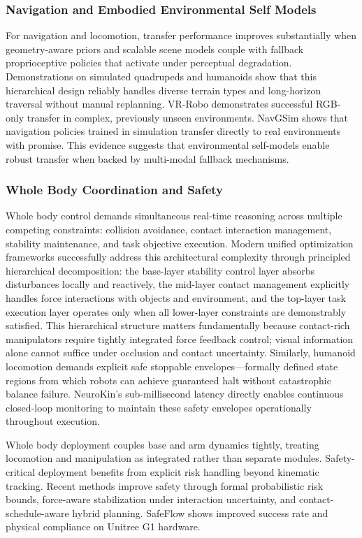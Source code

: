 ﻿\documentclass[11pt,a4paper]{article}
\begin{document}
\subsubsection{Navigation and Embodied Environmental Self Models}

For navigation and locomotion, transfer performance improves substantially when geometry-aware priors and scalable scene models couple with fallback proprioceptive policies that activate under perceptual degradation. Demonstrations on simulated quadrupeds and humanoids show that this hierarchical design reliably handles diverse terrain types and long-horizon traversal without manual replanning. VR-Robo demonstrates successful RGB-only transfer in complex, previously unseen environments. NavGSim shows that navigation policies trained in simulation transfer directly to real environments with promise. This evidence suggests that environmental self-models enable robust transfer when backed by multi-modal fallback mechanisms.

\subsubsection{Whole Body Coordination and Safety}

Whole body control demands simultaneous real-time reasoning across multiple competing constraints: collision avoidance, contact interaction management, stability maintenance, and task objective execution. Modern unified optimization frameworks successfully address this architectural complexity through principled hierarchical decomposition: the base-layer stability control layer absorbs disturbances locally and reactively, the mid-layer contact management explicitly handles force interactions with objects and environment, and the top-layer task execution layer operates only when all lower-layer constraints are demonstrably satisfied. This hierarchical structure matters fundamentally because contact-rich manipulators require tightly integrated force feedback control; visual information alone cannot suffice under occlusion and contact uncertainty. Similarly, humanoid locomotion demands explicit safe stoppable envelopes—formally defined state regions from which robots can achieve guaranteed halt without catastrophic balance failure. NeuroKin's sub-millisecond latency directly enables continuous closed-loop monitoring to maintain these safety envelopes operationally throughout execution.

Whole body deployment couples base and arm dynamics tightly, treating locomotion and manipulation as integrated rather than separate modules. Safety-critical deployment benefits from explicit risk handling beyond kinematic tracking. Recent methods improve safety through formal probabilistic risk bounds, force-aware stabilization under interaction uncertainty, and contact-schedule-aware hybrid planning. SafeFlow \cite{cho2026safeflow} shows improved success rate and physical compliance on Unitree G1 hardware.
\end{document}
